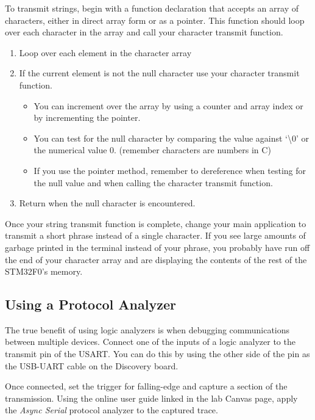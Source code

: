 \documentclass[openany,11pt,fleqn]{book} %
\begin{document}
To transmit strings, begin with a function declaration that accepts an array of characters, either in direct array form or as a pointer. This function should loop over each character in the array and call your character transmit function. 

\begin{enumerate}
    \item Loop over each element in the character array
    \item If the current element is not the null character use your character transmit function.
    \begin{itemize}
        \item You can increment over the array by using a counter and array index or by incrementing the pointer.
        \item You can test for the null character by comparing the value against `{\textbackslash}0' or the numerical value 0. (remember characters are numbers in C) 
        \item If you use the pointer method, remember to dereference when testing for the null value and when calling the character transmit function.
    \end{itemize} 
    \item Return when the null character is encountered. 
\end{enumerate}

Once your string transmit function is complete, change your main application to transmit a short phrase instead of a single character. If you see large amounts of garbage printed in the terminal instead of your phrase, you probably have run off the end of your character array and are displaying the contents of the rest of the STM32F0's memory. 

\subsection{Using a Protocol Analyzer}
The true benefit of using logic analyzers is when debugging communications between multiple devices. Connect one of the inputs of a logic analyzer to the transmit pin of the USART. You can do this by using the other side of the pin as the USB-UART cable on the Discovery board.

Once connected, set the trigger for falling-edge and capture a section of the transmission. Using the online user guide linked in the lab Canvas page, apply the \textit{Async Serial} protocol analyzer to the captured trace. 
\end{document}

